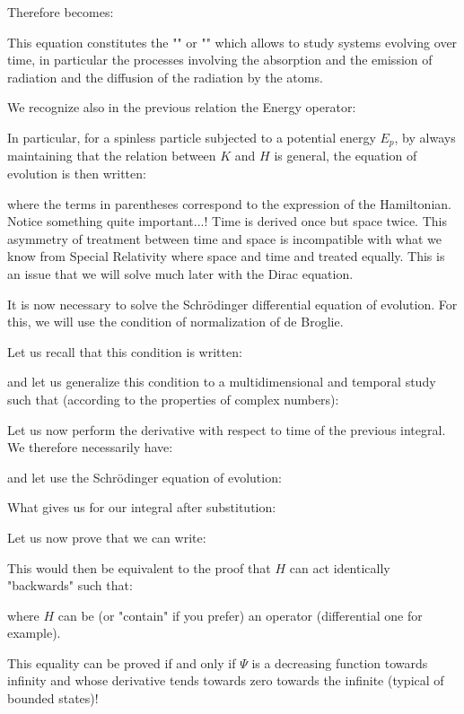 	Therefore becomes:
	
	This equation constitutes the "" or "" which allows to study systems evolving over time, in particular the processes involving the absorption and the emission of radiation and the diffusion of the radiation by the atoms.
	
	We recognize also in the previous relation the Energy operator:
	
	
	In particular, for a spinless particle subjected to a potential energy $E_p$, by always maintaining that the relation between $K$ and $H$ is general, the equation of evolution is then written\label{Schrödinger evolution equation}:
	
	where the terms in parentheses correspond to the expression of the Hamiltonian. Notice something quite important...! Time is derived once but space twice. This asymmetry of treatment between time and space is incompatible with what we know from Special Relativity where space and time and treated equally. This is an issue that we will solve much later with the Dirac equation.

	It is now necessary to solve the Schrödinger differential equation of evolution. For this, we will use the condition of normalization of de Broglie.

	Let us recall that this condition is written:
	
	and let us generalize this condition to a multidimensional and temporal study such that (according to the properties of complex numbers):
	
	Let us now perform the derivative with respect to time of the previous integral. We therefore necessarily have:
	
	and let use the Schrödinger equation of evolution:
	
	What gives us for our integral after substitution:
	
	Let us now prove that we can write:
	
	This would then be equivalent to the proof that $H$ can act identically "backwards" such that:
	
	where $H$ can be (or "contain" if you prefer) an operator (differential one for example).
	
	This equality can be proved if and only if $\Psi$ is a decreasing function  towards infinity and whose derivative tends towards zero towards the infinite (typical of bounded states)!
	
